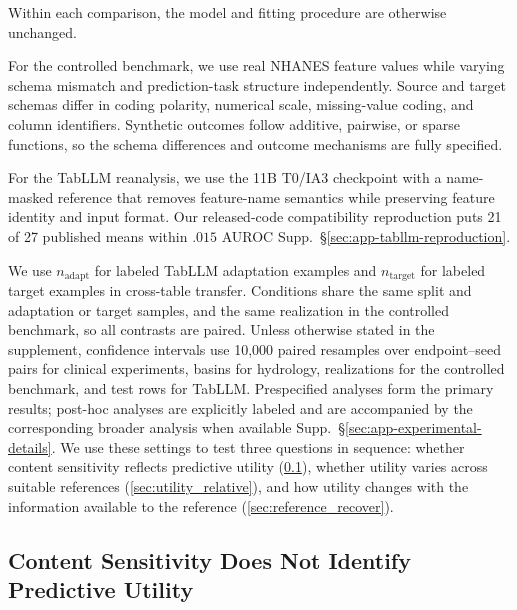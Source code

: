 \documentclass{article} %
\newcommand{\supp}[1]{\textnormal{Supp.~#1}}
\begin{document}
Within each comparison, the model and fitting procedure are otherwise unchanged.

For the controlled benchmark, we use real NHANES feature values while varying schema mismatch and prediction-task structure independently.
Source and target schemas differ in coding polarity, numerical scale, missing-value coding, and column identifiers.
Synthetic outcomes follow additive, pairwise, or sparse functions, so the schema differences and outcome mechanisms are fully specified.

For the TabLLM reanalysis, we use the 11B T0/IA3 checkpoint with a name-masked reference that removes feature-name semantics while preserving feature identity and input format.
Our released-code compatibility reproduction puts 21 of 27 published means within $.015$ AUROC \supp{\S\ref{sec:app-tabllm-reproduction}}.

We use $n_{\mathrm{adapt}}$ for labeled TabLLM adaptation examples and $n_{\mathrm{target}}$ for labeled target examples in cross-table transfer.
Conditions share the same split and adaptation or target samples, and the same realization in the controlled benchmark, so all contrasts are paired.
Unless otherwise stated in the supplement, confidence intervals use 10,000 paired
resamples over endpoint--seed pairs for clinical experiments, basins for hydrology,
realizations for the controlled benchmark, and test rows for TabLLM.
Prespecified analyses form the primary results; post-hoc analyses are explicitly labeled and are accompanied by the corresponding broader analysis when available \supp{\S\ref{sec:app-experimental-details}}.
We use these settings to test three questions in sequence: whether content sensitivity reflects predictive utility (\ref{sec:gap_composition}), whether utility varies across suitable references (\ref{sec:utility_relative}), and how utility changes with the information available to the reference (\ref{sec:reference_recover}).

\subsection{Content Sensitivity Does Not Identify Predictive Utility}
\label{sec:gap_composition}
\end{document}
